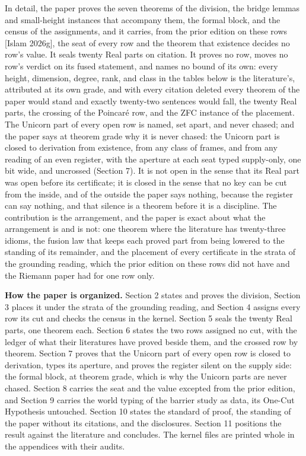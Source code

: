 \documentclass[10pt,twocolumn]{article}
\begin{document}
In detail, the paper proves the seven theorems of the division, the
bridge lemmas and small-height instances that accompany them, the formal
block, and the census of the assignments, and it carries, from the prior
edition on these rows {[}Islam 2026g{]}, the seat of every row and the
theorem that existence decides no row's value. It seals twenty Real
parts on citation. It proves no row, moves no row's verdict on its fused
statement, and names no bound of its own: every height, dimension,
degree, rank, and class in the tables below is the literature's,
attributed at its own grade, and with every citation deleted every
theorem of the paper would stand and exactly twenty-two sentences would
fall, the twenty Real parts, the crossing of the Poincaré row, and the
ZFC instance of the placement. The Unicorn part of every open row is
named, set apart, and never chased; and the paper says at theorem grade
why it is never chased: the Unicorn part is closed to derivation from
existence, from any class of frames, and from any reading of an even
register, with the aperture at each seat typed supply-only, one bit
wide, and uncrossed (Section 7). It is not open in the sense that its
Real part was open before its certificate; it is closed in the sense
that no key can be cut from the inside, and of the outside the paper
says nothing, because the register can say nothing, and that silence is
a theorem before it is a discipline. The contribution is the
arrangement, and the paper is exact about what the arrangement is and is
not: one theorem where the literature has twenty-three idioms, the
fusion law that keeps each proved part from being lowered to the
standing of its remainder, and the placement of every certificate in the
strata of the grounding reading, which the prior edition on these rows
did not have and the Riemann paper had for one row only.

\textbf{How the paper is organized.} Section 2 states and proves the
division, Section 3 places it under the strata of the grounding reading,
and Section 4 assigns every row its cut and checks the census in the
kernel. Section 5 seals the twenty Real parts, one theorem each. Section
6 states the two rows assigned no cut, with the ledger of what their
literatures have proved beside them, and the crossed row by theorem.
Section 7 proves that the Unicorn part of every open row is closed to
derivation, types its aperture, and proves the register silent on the
supply side: the formal block, at theorem grade, which is why the
Unicorn parts are never chased. Section 8 carries the seat and the value
excepted from the prior edition, and Section 9 carries the world typing
of the barrier study as data, its One-Cut Hypothesis untouched. Section
10 states the standard of proof, the standing of the paper without its
citations, and the disclosures. Section 11 positions the result against
the literature and concludes. The kernel files are printed whole in the
appendices with their audits.
\end{document}
